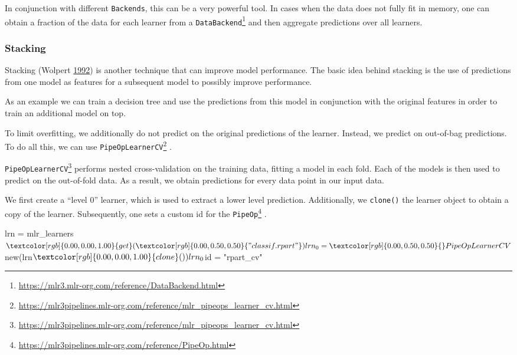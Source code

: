 \documentclass[12pt,]{scrbook}
\newenvironment{Shaded}{}{}
\newcommand{\DecValTok}[1]{#1}
\newcommand{\KeywordTok}[1]{\textcolor[rgb]{0.00,0.00,1.00}{#1}}
\newcommand{\NormalTok}[1]{#1}
\newcommand{\OperatorTok}[1]{#1}
\newcommand{\StringTok}[1]{\textcolor[rgb]{0.00,0.50,0.50}{#1}}
\renewcommand{\href}[2]{#2\footnote{\url{#1}}}
\begin{document}
In conjunction with different \texttt{Backends}, this can be a very powerful tool.
In cases when the data does not fully fit in memory, one can obtain a fraction of the data for each learner from a \href{https://mlr3.mlr-org.com/reference/DataBackend.html}{\texttt{DataBackend}} and then aggregate predictions over all learners.

\hypertarget{pipe-model-ensembles-stacking}{%
\subsubsection{Stacking}\label{pipe-model-ensembles-stacking}}

Stacking (Wolpert \protect\hyperlink{ref-Wolpert1992}{1992}) is another technique that can improve model performance.
The basic idea behind stacking is the use of predictions from one model as features for a subsequent model to possibly improve performance.

As an example we can train a decision tree and use the predictions from this model in conjunction with the original features in order to train an additional model on top.

To limit overfitting, we additionally do not predict on the original predictions of the learner.
Instead, we predict on out-of-bag predictions.
To do all this, we can use \href{https://mlr3pipelines.mlr-org.com/reference/mlr_pipeops_learner_cv.html}{\texttt{PipeOpLearnerCV}} .

\href{https://mlr3pipelines.mlr-org.com/reference/mlr_pipeops_learner_cv.html}{\texttt{PipeOpLearnerCV}} performs nested cross-validation on the training data, fitting a model in each fold.
Each of the models is then used to predict on the out-of-fold data.
As a result, we obtain predictions for every data point in our input data.

We first create a ``level 0'' learner, which is used to extract a lower level prediction.
Additionally, we \texttt{clone()} the learner object to obtain a copy of the learner.
Subsequently, one sets a custom id for the \href{https://mlr3pipelines.mlr-org.com/reference/PipeOp.html}{\texttt{PipeOp}} .

\begin{Shaded}
\begin{Highlighting}[]
\NormalTok{lrn =}\StringTok{ }\NormalTok{mlr_learners}\OperatorTok{$}\KeywordTok{get}\NormalTok{(}\StringTok{"classif.rpart"}\NormalTok{)}
\NormalTok{lrn_}\DecValTok{0}\NormalTok{ =}\StringTok{ }\NormalTok{PipeOpLearnerCV}\OperatorTok{$}\KeywordTok{new}\NormalTok{(lrn}\OperatorTok{$}\KeywordTok{clone}\NormalTok{())}
\NormalTok{lrn_}\DecValTok{0}\OperatorTok{$}\NormalTok{id =}\StringTok{ "rpart_cv"}
\end{Highlighting}
\end{Shaded}
\end{document}
